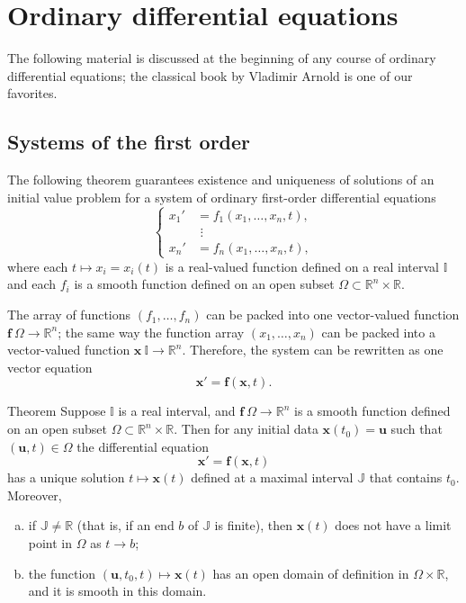 \section{Ordinary differential equations}

The following material is discussed at the beginning of any course of ordinary differential equations; the classical book by Vladimir Arnold \cite{arnold} is one of our favorites.


\subsection*{Systems of the first order}

The following theorem guarantees existence and uniqueness of solutions of an initial value problem
for a system of ordinary first-order differential equations
\[
\begin{cases}
x_1'&=f_1(x_1,\dots,x_n,t),
\\
&\,\,\vdots
\\
x_n'&=f_n(x_1,\dots,x_n,t),
\end{cases}
\]
where each $t\mapsto x_i=x_i(t)$ is a real-valued function defined on a real interval $\mathbb{I}$
and each $f_i$ is a smooth function defined on an open subset $\Omega\subset \mathbb{R}^n\times \mathbb{R}$.

The array of functions $(f_1,\dots,f_n)$ can be packed into one vector-valued function 
$\bm{f}\:\Omega\to \mathbb{R}^n$;
the same way the function array $(x_1,\dots,x_n)$ can be packed into a vector-valued function  $\bm{x}\:\mathbb{I}\to\mathbb{R}^n$.
Therefore, the system can be rewritten as one vector equation 
\[\bm{x}'=\bm{f}(\bm{x}, t).\] 

\begin{thm}{Theorem}\label{thm:ODE}
Suppose $\mathbb{I}$ is a real interval, and $\bm{f}\:\Omega\to \mathbb{R}^n$ is a smooth function defined on an open subset $\Omega\subset \mathbb{R}^n\times \mathbb{R}$.
Then for any initial data $\bm{x}(t_0)=\bm{u}$ such that $(\bm{u},t)\in\Omega$ the differential equation 
\[\bm{x}'=\bm{f}(\bm{x},t)\]
has a unique solution $t\mapsto \bm{x}(t)$ defined at a maximal interval $\mathbb{J}$ that contains $t_0$.
Moreover,
\begin{enumerate}[(a)]
\item  if $\mathbb{J}\ne \mathbb{R}$ (that is, if an end $b$ of $\mathbb{J}$ is finite), then $\bm{x}(t)$ does not have a limit point in $\Omega$ as $t\to b$;
\item  the function $(\bm{u},t_0,t)\mapsto \bm{x}(t)$ has an open domain of definition in $\Omega\times \mathbb{R}$, and it is smooth in this domain.
\end{enumerate}

\end{thm}

